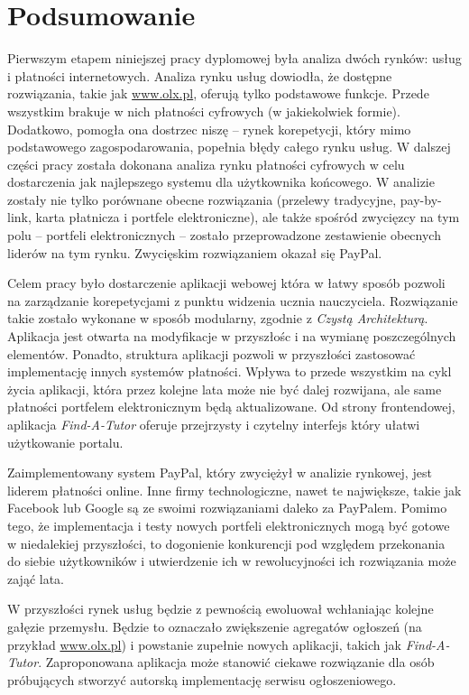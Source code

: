 \documentclass[12pt]{article}
\numberwithin{figure}{section}
\begin{document}
\begin{sloppypar}
\section{Podsumowanie}
Pierwszym etapem niniejszej pracy dyplomowej była analiza dwóch rynków: usług i płatności internetowych. Analiza rynku usług dowiodła, że dostępne rozwiązania, takie jak \url{www.olx.pl}, oferują tylko podstawowe funkcje. Przede wszystkim brakuje w nich płatności cyfrowych (w jakiekolwiek formie). Dodatkowo, pomogła ona dostrzec niszę -- rynek korepetycji, który mimo podstawowego zagospodarowania, popełnia błędy całego rynku usług. W dalszej części pracy została dokonana analiza rynku płatności cyfrowych w celu dostarczenia jak najlepszego systemu dla użytkownika końcowego. W analizie zostały nie tylko porównane obecne rozwiązania (przelewy tradycyjne, pay-by-link, karta płatnicza i portfele elektroniczne), ale także spośród zwycięzcy na tym polu -- portfeli elektronicznych -- zostało przeprowadzone zestawienie obecnych liderów na tym rynku. Zwycięskim rozwiązaniem okazał się PayPal. 

Celem pracy było dostarczenie aplikacji webowej która w łatwy sposób pozwoli na zarządzanie korepetycjami z punktu widzenia ucznia nauczyciela. Rozwiązanie takie zostało wykonane w sposób modularny, zgodnie z \textit{Czystą Architekturą}. Aplikacja jest otwarta na modyfikacje w przyszłośc i na wymianę poszczególnych elementów. Ponadto, struktura aplikacji pozwoli w przyszłości zastosować implementację innych systemów płatności. Wpływa to przede wszystkim na cykl życia aplikacji, która przez kolejne lata może nie być dalej rozwijana, ale same płatności portfelem elektronicznym będą aktualizowane. Od strony frontendowej, aplikacja \textit{Find-A-Tutor} oferuje przejrzysty i czytelny interfejs który ułatwi użytkowanie portalu. 

Zaimplementowany system PayPal, który zwyciężył w analizie rynkowej, jest liderem płatności online. Inne firmy technologiczne, nawet te największe, takie jak Facebook lub Google są ze swoimi rozwiązaniami daleko za PayPalem. Pomimo tego, że implementacja i testy nowych portfeli elektronicznych mogą być gotowe w niedalekiej przyszłości, to dogonienie konkurencji pod względem przekonania do siebie użytkowników i utwierdzenie ich w rewolucyjności ich rozwiązania może zająć lata.

W przyszłości rynek usług będzie z pewnością ewoluował wchłaniając kolejne gałęzie przemysłu. Będzie to oznaczało zwiększenie agregatów ogłoszeń (na przykład \url{www.olx.pl}) i powstanie zupełnie nowych aplikacji, takich jak \textit{Find-A-Tutor}. Zaproponowana aplikacja może stanowić ciekawe rozwiązanie dla osób próbujących stworzyć autorską implementację serwisu ogłoszeniowego.


\end{sloppypar}
\end{document}
